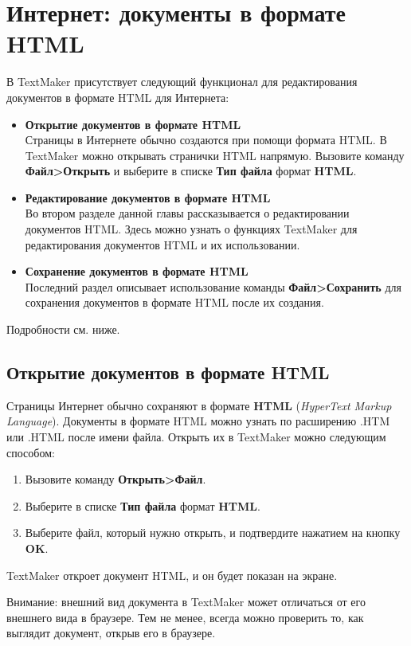 ﻿\documentclass[a4paper,10pt]{article}
\begin{document}
\section{Интернет: документы в формате HTML} \label{sec:доквформhtml}
В TextMaker присутствует следующий функционал для редактирования документов в формате HTML для Интернета:
\begin{itemize}
 \item \textbf{Открытие документов в формате HTML}\\
 Страницы в Интернете обычно создаются при помощи формата HTML. В TextMaker можно открывать странички HTML напрямую. Вызовите команду \textbf{Файл>Открыть} и выберите в списке \textbf{Тип файла} формат \textbf{HTML}.
 \item \textbf{Редактирование документов в формате HTML}\\
 Во втором разделе данной главы рассказывается о редактировании документов HTML. Здесь можно узнать о функциях TextMaker для редактирования документов HTML и их использовании.
 \item \textbf{Сохранение документов в формате HTML}\\
 Последний раздел описывает использование команды \textbf{Файл>Сохранить} для сохранения документов в формате HTML после их создания.
\end{itemize}

Подробности см. ниже.

\subsection{Открытие документов в формате HTML}
Страницы Интернет обычно сохраняют в формате \textbf{HTML} (\textit{HyperText Markup Language}). Документы в формате HTML можно узнать по расширению \textsc{.HTM} или \textsc{.HTML} после имени файла. Открыть их в TextMaker можно следующим способом:
\begin{enumerate}
 \item Вызовите команду \textbf{Открыть>Файл}.
 \item Выберите в списке \textbf{Тип файла} формат \textbf{HTML}.
 \item Выберите файл, который нужно открыть, и подтвердите нажатием на кнопку \textbf{OK}.
\end{enumerate}

TextMaker откроет документ HTML, и он будет показан на экране.

Внимание: внешний вид документа в TextMaker может отличаться от его внешнего вида в браузере. Тем не менее, всегда можно проверить то, как выглядит документ, открыв его в браузере. 
\end{document}
